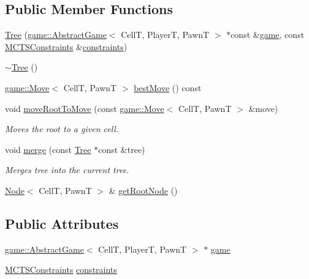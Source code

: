 \subsection*{Public Member Functions}
\begin{DoxyCompactItemize}
\item 
\hyperlink{classmcts_1_1_tree_aa0f841a62bc4884486260200fb1bef10}{Tree} (\hyperlink{classgame_1_1_abstract_game}{game\+::\+Abstract\+Game}$<$ CellT, PlayerT, PawnT $>$ $\ast$const \&\hyperlink{classmcts_1_1_tree_a39aa3a398cd8a0c431ffd39fbe4965f6}{game}, const \hyperlink{structmcts_1_1_m_c_t_s_constraints}{M\+C\+T\+S\+Constraints} \&\hyperlink{classmcts_1_1_tree_a3abe0cefe48df8d8ee080458497d8969}{constraints})
\item 
\hyperlink{classmcts_1_1_tree_a4656482e061c8dd2b78fcf048c1b20a3}{$\sim$\+Tree} ()
\item 
\hyperlink{structgame_1_1_move}{game\+::\+Move}$<$ CellT, PawnT $>$ \hyperlink{classmcts_1_1_tree_a0431bd1074e29e682fe3c7bc6a3aee89}{best\+Move} () const
\item 
void \hyperlink{classmcts_1_1_tree_abe24265d4d862d951163be405384f2b3}{move\+Root\+To\+Move} (const \hyperlink{structgame_1_1_move}{game\+::\+Move}$<$ CellT, PawnT $>$ \&move)
\begin{DoxyCompactList}\small\item\em Moves the root to a given cell. \end{DoxyCompactList}\item 
void \hyperlink{classmcts_1_1_tree_a06139b9922488bb26feb25745e54e508}{merge} (const \hyperlink{classmcts_1_1_tree}{Tree} $\ast$const \&tree)
\begin{DoxyCompactList}\small\item\em Merges tree into the current tree. \end{DoxyCompactList}\item 
\hyperlink{structmcts_1_1_node}{Node}$<$ CellT, PawnT $>$ \& \hyperlink{classmcts_1_1_tree_a75496cb3742583b221c1b95d8fd85718}{get\+Root\+Node} ()
\end{DoxyCompactItemize}
\subsection*{Public Attributes}
\begin{DoxyCompactItemize}
\item 
\hyperlink{classgame_1_1_abstract_game}{game\+::\+Abstract\+Game}$<$ CellT, PlayerT, PawnT $>$ $\ast$ \hyperlink{classmcts_1_1_tree_a39aa3a398cd8a0c431ffd39fbe4965f6}{game}
\item 
\hyperlink{structmcts_1_1_m_c_t_s_constraints}{M\+C\+T\+S\+Constraints} \hyperlink{classmcts_1_1_tree_a3abe0cefe48df8d8ee080458497d8969}{constraints}
\end{DoxyCompactItemize}
